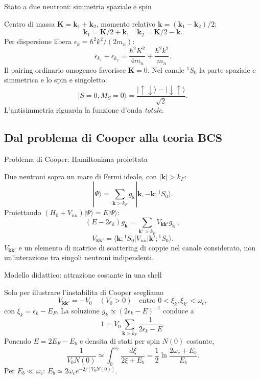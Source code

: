 \begin{frame}[t]{Stato a due neutroni: simmetria spaziale e spin}
\vspace*{3mm}
\small

Centro di massa $\mathbf K=\mathbf k_1+\mathbf k_2$, momento relativo $\mathbf k=(\mathbf k_1-\mathbf k_2)/2$:
\[
\mathbf k_1=\mathbf K/2+\mathbf k,\quad
\mathbf k_2=\mathbf K/2-\mathbf k.
\]
Per dispersione libera $\epsilon_k=\hbar^2k^2/(2m_n)$:
\[
\epsilon_{k_1}+\epsilon_{k_2}
=\frac{\hbar^2K^2}{4m_n}+\frac{\hbar^2k^2}{m_n}.
\]
Il pairing ordinario omogeneo favorisce $\mathbf K=0$.
Nel canale ${}^1S_0$ la parte spaziale e simmetrica e lo spin e singoletto:
\[
|S=0,M_S=0\rangle=
\frac{|\uparrow\downarrow\rangle-|\downarrow\uparrow\rangle}{\sqrt2}.
\]
L'antisimmetria riguarda la funzione d'onda \emph{totale}.
\end{frame}

\subsection{Dal problema di Cooper alla teoria BCS}

\begin{frame}[t]{Problema di Cooper: Hamiltoniana proiettata}
\vspace*{3mm}
\small

Due neutroni sopra un mare di Fermi ideale, con $|\mathbf k|>k_F$:
\[
|\Psi\rangle=\sum_{\mathbf k>k_F}g_{\mathbf k}
|\mathbf k,-\mathbf k;{}^1S_0\rangle.
\]
Proiettando $(H_0+V_{nn})|\Psi\rangle=E|\Psi\rangle$:
\[
\boxed{(E-2\epsilon_k)g_{\mathbf k}=
\sum_{\mathbf k'>k_F}V_{\mathbf k\mathbf k'}g_{\mathbf k'},}
\]
\[
V_{\mathbf k\mathbf k'}=
\langle\mathbf k;{}^1S_0|V_{nn}|\mathbf k';{}^1S_0\rangle.
\]
$V_{\mathbf k\mathbf k'}$ e un elemento di matrice di scattering di coppie nel canale considerato, non un'interazione tra singoli neutroni indipendenti.
\end{frame}

\begin{frame}[t]{Modello didattico: attrazione costante in una shell}
\vspace*{3mm}
\small

Solo per illustrare l'instabilita di Cooper scegliamo
\[
V_{\mathbf k\mathbf k'}=-V_0\quad(V_0>0)
\quad\text{entro }0<\xi_k,\xi_{k'}<\omega_c,
\]
con $\xi_k=\epsilon_k-E_F$.
La soluzione $g_k\propto(2\epsilon_k-E)^{-1}$ conduce a
\[
1=V_0\sum_{\mathbf k>k_F}\frac1{2\epsilon_k-E}.
\]
Ponendo $E=2E_F-E_b$ e densita di stati per spin $N(0)$ costante,
\[
\frac1{V_0N(0)}
\simeq\int_0^{\omega_c}\frac{d\xi}{2\xi+E_b}
=\frac12\ln\frac{2\omega_c+E_b}{E_b}.
\]
Per $E_b\ll\omega_c$: $E_b\simeq2\omega_c e^{-2/[V_0N(0)]}$.
\end{frame}


